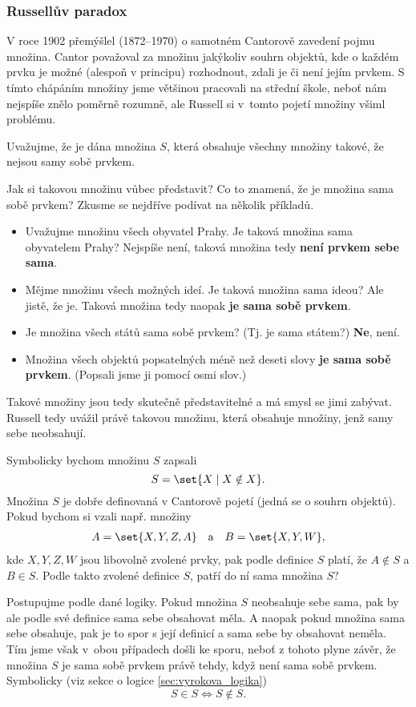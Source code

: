 \subsubsection{Russellův paradox}
V roce 1902 přemýšlel  (1872--1970) o samotném Cantorově zavedení pojmu množina. Cantor považoval za množinu jakýkoliv souhrn objektů, kde o každém prvku je možné (alespoň v principu) rozhodnout, zdali je či není jejím prvkem. S tímto chápáním množiny jsme většinou pracovali na střední škole, neboť nám nejspíše znělo poměrně rozumně, ale Russell si v~tomto pojetí množiny všiml problému.\par
Uvažujme, že je dána množina $S$, která obsahuje všechny množiny takové, že nejsou samy sobě prvkem.\par
Jak si takovou množinu vůbec představit? Co to znamená, že je množina sama sobě prvkem? Zkusme se nejdříve podívat na několik příkladů.
\begin{itemize}
    \item Uvažujme množinu všech obyvatel Prahy. Je taková množina sama obyvatelem Prahy? Nejspíše není, taková množina tedy \textbf{není prvkem sebe sama}.
    \item Mějme množinu všech možných ideí. Je taková množina sama ideou? Ale jistě, že je. Taková množina tedy naopak \textbf{je sama sobě prvkem}.
    \item Je množina všech států sama sobě prvkem? (Tj. je sama státem?) \textbf{Ne}, není.
    \item Množina všech objektů popsatelných méně než deseti slovy \textbf{je sama sobě prvkem}. (Popsali jsme ji pomocí osmi slov.)
\end{itemize}
Takové množiny jsou tedy skutečně představitelné a má smysl se jimi zabývat. Russell tedy uvážil právě takovou množinu, která obsahuje množiny, jenž samy sebe neobsahují.

Symbolicky bychom množinu $S$ zapsali
\begin{equation*}
S=\set{X \mid X \notin X}.
\end{equation*}
Množina $S$ je dobře definovaná v Cantorově pojetí (jedná se o souhrn objektů). Pokud bychom si vzali např. množiny
\begin{align*}
A=\set{X,Y,Z,A} \quad \text{a} \quad B=\set{X,Y,W},
\end{align*}
kde $X,Y,Z,W$ jsou libovolně zvolené prvky, pak podle definice $S$ platí, že $A \notin S$ a $B \in S$. Podle takto zvolené definice $S$, patří do ní sama množina $S$?\par
Postupujme podle dané logiky. Pokud množina $S$ neobsahuje sebe sama, pak by ale podle své definice sama sebe obsahovat měla. A naopak pokud množina sama sebe obsahuje, pak je to spor s její definicí a sama sebe by obsahovat neměla. Tím jsme však v~obou případech došli ke sporu, neboť z tohoto plyne závěr, že množina $S$ je sama sobě prvkem právě tehdy, když není sama sobě prvkem. Symbolicky (viz sekce o logice \ref{sec:vyrokova_logika})
\begin{equation*}
S \in S \iff S \notin S.
\end{equation*}

